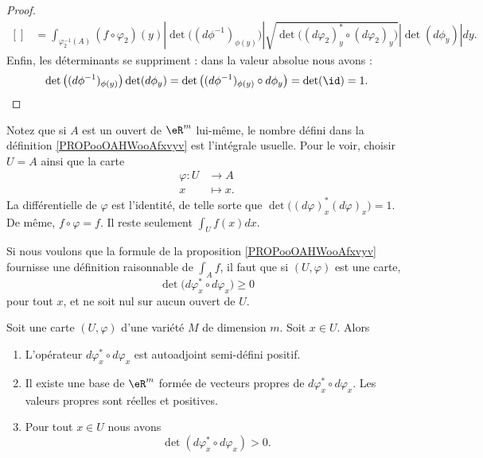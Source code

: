 \begin{proof}
\begin{equation}
\begin{aligned}[]
			                         & =\int_{\varphi^{-1}_2(A)}(f\circ\varphi_2)(y)| \det\big( (d\phi^{-1})_{\phi(y)} \big) |\sqrt{ \det\big( (d\varphi_2)_y^*\circ(d\varphi_2)_y \big) }| \det(d\phi_y) |dy.
		\end{aligned}
	\end{equation}
	Enfin, les déterminants se suppriment : dans la valeur absolue nous avons :
	\begin{equation}
		\det\big( (d\phi^{-1})_{\phi(y)} \big)\det(d\phi_y)=\det\big( (d\phi^{-1})_{\phi(y)}\circ d\phi_y \big)=\det(\id)=1.
	\end{equation}
\end{proof}

\begin{normaltext}
	Notez que si \( A\) est un ouvert de \( \eR^m\) lui-même, le nombre défini dans la définition \ref{PROPooOAHWooAfxvyv} est l'intégrale usuelle. Pour le voir, choisir \( U=A\) ainsi que la carte
	\begin{equation}
		\begin{aligned}
			\varphi\colon U & \to A      \\
			x               & \mapsto x.
		\end{aligned}
	\end{equation}
	La différentielle de \( \varphi\) est l'identité, de telle sorte que \( \det\big( (d\varphi)_x^*(d\varphi)_x \big)=1\). De même, \( f\circ \varphi=f\). Il reste seulement \( \int_Uf(x)dx\).
\end{normaltext}

Si nous voulons que la formule de la proposition \ref{PROPooOAHWooAfxvyv} fournisse une définition raisonnable de \( \int_Af\), il faut que si \( (U,\varphi)\) est une carte,
\begin{equation}
	\det\big( d\varphi_x^*\circ d\varphi_x \big)\geq 0
\end{equation}
pour tout \( x\), et ne soit nul sur aucun ouvert de \( U\).

\begin{lemma}
	Soit une carte \( (U,\varphi)\) d'une variété \( M\) de dimension \( m\). Soit \( x\in U\). Alors
	\begin{enumerate}
		\item
		      L'opérateur \( d\varphi_x^*\circ d\varphi_x\) est autoadjoint semi-défini positif.
		\item
		      Il existe une base de \( \eR^m\) formée de vecteurs propres de \( d\varphi_x^*\circ d\varphi_x\). Les valeurs propres sont réelles et positives.
		\item
		      Pour tout \( x\in U\) nous avons
		      \begin{equation}
			      \det(d\varphi_x^*\circ d\varphi_x) > 0.
		      \end{equation}
	\end{enumerate}
\end{lemma}


